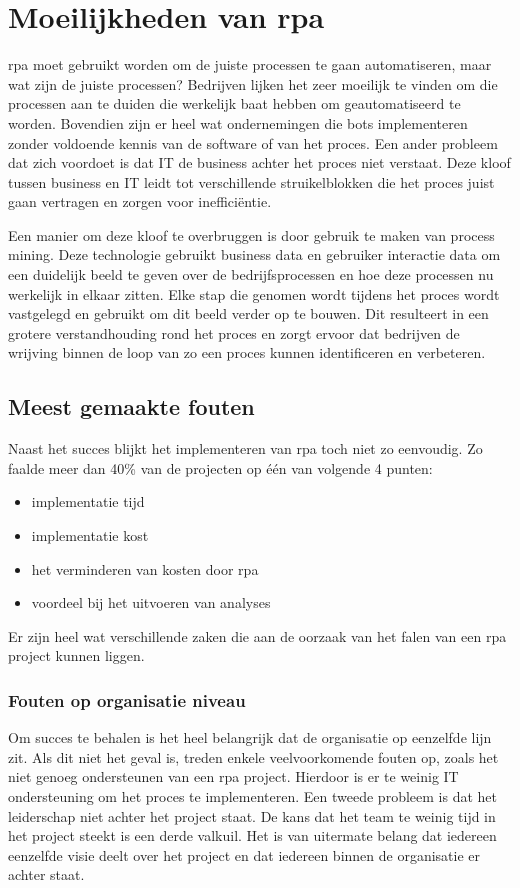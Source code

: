 \section{Moeilijkheden van \acrshort{rpa}}
\acrshort{rpa} moet gebruikt worden om de juiste processen te gaan automatiseren, maar wat zijn de juiste processen? Bedrijven lijken het zeer moeilijk te vinden om die processen aan te duiden die werkelijk baat hebben om geautomatiseerd te worden. Bovendien zijn er heel wat ondernemingen die bots implementeren zonder voldoende kennis van de software of van het proces. Een ander probleem dat zich voordoet is dat IT de business achter het proces niet verstaat. Deze kloof tussen business en IT leidt tot verschillende struikelblokken die het proces juist gaan vertragen en zorgen voor inefficiëntie. \autocite{cFutRPA}

Een manier om deze kloof te overbruggen is door gebruik te maken van process mining. Deze technologie gebruikt business data en gebruiker interactie data om een duidelijk beeld te geven over de bedrijfsprocessen en hoe deze processen nu werkelijk in elkaar zitten. Elke stap die genomen wordt tijdens het proces wordt vastgelegd en gebruikt om dit beeld verder op te bouwen. Dit resulteert in een grotere verstandhouding rond het proces en zorgt ervoor dat bedrijven de wrijving binnen de loop van zo een proces kunnen identificeren en verbeteren. \autocite{cFutRPA}

\subsection{Meest gemaakte fouten}
Naast het succes blijkt het implementeren van \acrshort{rpa} toch niet zo eenvoudig. Zo faalde meer dan 40\% van de projecten op één van volgende 4 punten:
\begin{itemize}
	\item implementatie tijd
	\item implementatie kost
	\item het verminderen van kosten door \acrshort{rpa}
	\item voordeel bij het uitvoeren van analyses
\end{itemize}

Er zijn heel wat verschillende zaken die aan de oorzaak van het falen van een \acrshort{rpa} project kunnen liggen. \autocite{pitfallsRPA}

\subsubsection{Fouten op organisatie niveau}
Om succes te behalen is het heel belangrijk dat de organisatie op eenzelfde lijn zit. Als dit niet het geval is, treden enkele veelvoorkomende fouten op, zoals het niet genoeg ondersteunen van een \acrshort{rpa} project. Hierdoor is er te weinig IT ondersteuning om het proces te implementeren. Een tweede probleem is dat het leiderschap niet achter het project staat.  De kans dat het team te weinig tijd in het project steekt is een derde valkuil. Het is van uitermate belang dat iedereen eenzelfde visie deelt over het project en dat iedereen binnen de organisatie er achter staat. \autocite{pitfallsRPA}

